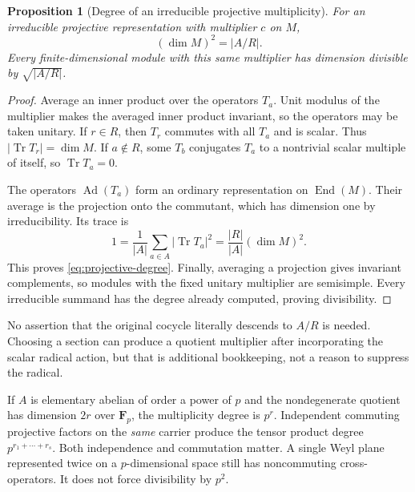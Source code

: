 \documentclass[11pt]{article}
\newtheorem{proposition}{Proposition}[section]
\theoremstyle{definition}\newtheorem{definition}[proposition]{Definition}
\newcommand{\End}{\operatorname{End}}
\newcommand{\Tr}{\operatorname{Tr}}
\newcommand{\F}{\mathbf F}
\begin{document}
\begin{proposition}[Degree of an irreducible projective multiplicity]\label{prop:degree}
For an irreducible projective representation with multiplier $c$ on $M$,
\[
 (\dim M)^2=|A/R|.
 \tag{15.1}\label{eq:projective-degree}
\]
Every finite-dimensional module with this same multiplier has dimension divisible by $\sqrt{|A/R|}$.
\end{proposition}
\begin{proof}
Average an inner product over the operators $T_a$. Unit modulus of the multiplier makes the averaged inner product invariant, so the operators may be taken unitary. If $r\in R$, then $T_r$ commutes with all $T_a$ and is scalar. Thus $|\Tr T_r|=\dim M$. If $a\notin R$, some $T_b$ conjugates $T_a$ to a nontrivial scalar multiple of itself, so $\Tr T_a=0$.

The operators $\operatorname{Ad}(T_a)$ form an ordinary representation on $\End(M)$. Their average is the projection onto the commutant, which has dimension one by irreducibility. Its trace is
\[
 1=\frac{1}{|A|}\sum_{a\in A}|\Tr T_a|^2
   =\frac{|R|}{|A|}(\dim M)^2.
\]
This proves \eqref{eq:projective-degree}. Finally, averaging a projection gives invariant complements, so modules with the fixed unitary multiplier are semisimple. Every irreducible summand has the degree already computed, proving divisibility.
\end{proof}

No assertion that the original cocycle literally descends to $A/R$ is needed. Choosing a section can produce a quotient multiplier after incorporating the scalar radical action, but that is additional bookkeeping, not a reason to suppress the radical.

If $A$ is elementary abelian of order a power of $p$ and the nondegenerate quotient has dimension $2r$ over $\F_p$, the multiplicity degree is $p^r$. Independent commuting projective factors on the \emph{same} carrier produce the tensor product degree $p^{r_1+\cdots+r_s}$. Both independence and commutation matter. A single Weyl plane represented twice on a $p$-dimensional space still has noncommuting cross-operators. It does not force divisibility by $p^2$.
\end{document}
